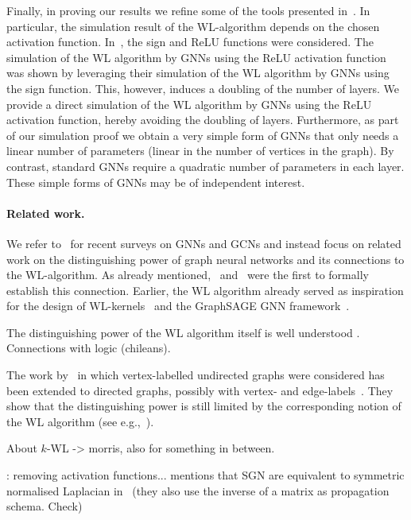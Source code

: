 Finally, in proving our results we refine some of the tools presented in~\cite{grohewl}. In particular, the simulation result of the WL-algorithm depends on the chosen activation function. In~\cite{grohewl}, the sign and ReLU functions were considered. The simulation of the WL algorithm by GNNs using the ReLU activation function was shown by leveraging their simulation of the WL algorithm by GNNs using the sign function. This, however, induces a doubling of the number of layers. We provide a direct simulation of the WL algorithm by GNNs using the ReLU activation function, hereby avoiding the doubling of layers.
Furthermore, as part of our simulation proof we obtain a very simple form of GNNs that only needs a linear number of parameters (linear in the number of vertices in the graph). By contrast, standard GNNs require a quadratic number of parameters in each layer. These simple forms of GNNs may be of independent interest.

\paragraph{Related work.}
We refer to~\cite{Zhou2018,Zonghan2019} for recent surveys on GNNs and GCNs and instead focus on related work on the distinguishing power of graph neural networks and its connections to the WL-algorithm. As already mentioned,~\cite{xhlj19} and~\cite{grohewl}
were the first to formally establish this connection. Earlier, the WL algorithm already served as inspiration for the design of WL-kernels~\cite{Shrvashidze2011} and the GraphSAGE GNN framework~\cite{Hamilton2017a}. 

The distinguishing power of the WL algorithm itself is well understood
\cite{CaiFI92,KieferSS15,ArvindKRV17}. Connections with logic (chileans).

The work by~\cite{grohewl} in which vertex-labelled undirected graphs were considered has been extended to directed graphs, possibly with vertex- and edge-labels~\cite{Jaume2019}. They show that the distinguishing power is still limited by the corresponding notion of the WL algorithm (see e.g.,~\cite{}). 

About $k$-WL -> morris, also
\cite{NIPS2019_8488} for something in between.

\cite{Wu2019}\cite{Cai2018}: removing activation functions...
\cite{journals/pieee/OrtegaFKMV18} mentions that SGN are equivalent to symmetric normalised Laplacian in~\cite{Vignac2019OnTC} (they also use the inverse of a matrix as propagation schema. Check)

